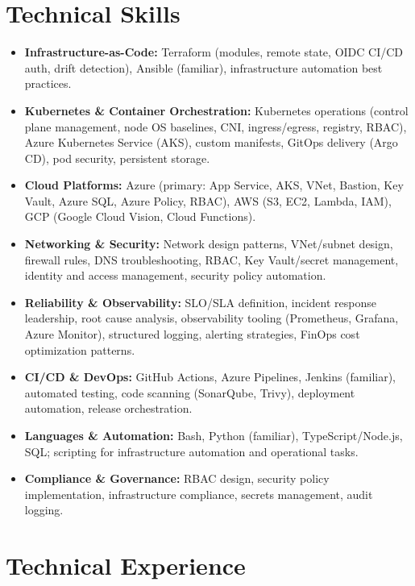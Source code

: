 \documentclass[11pt,a4paper]{article}
\begin{document}
\section{Technical Skills}
\begin{itemize}
    \item \textbf{Infrastructure-as-Code:} Terraform (modules, remote state, OIDC CI/CD auth, drift detection), Ansible (familiar), infrastructure automation best practices.
    \item \textbf{Kubernetes \& Container Orchestration:} Kubernetes operations (control plane management, node OS baselines, CNI, ingress/egress, registry, RBAC), Azure Kubernetes Service (AKS), custom manifests, GitOps delivery (Argo CD), pod security, persistent storage.
    \item \textbf{Cloud Platforms:} Azure (primary: App Service, AKS, VNet, Bastion, Key Vault, Azure SQL, Azure Policy, RBAC), AWS (S3, EC2, Lambda, IAM), GCP (Google Cloud Vision, Cloud Functions).
    \item \textbf{Networking \& Security:} Network design patterns, VNet/subnet design, firewall rules, DNS troubleshooting, RBAC, Key Vault/secret management, identity and access management, security policy automation.
    \item \textbf{Reliability \& Observability:} SLO/SLA definition, incident response leadership, root cause analysis, observability tooling (Prometheus, Grafana, Azure Monitor), structured logging, alerting strategies, FinOps cost optimization patterns.
    \item \textbf{CI/CD \& DevOps:} GitHub Actions, Azure Pipelines, Jenkins (familiar), automated testing, code scanning (SonarQube, Trivy), deployment automation, release orchestration.
    \item \textbf{Languages \& Automation:} Bash, Python (familiar), TypeScript/Node.js, SQL; scripting for infrastructure automation and operational tasks.
    \item \textbf{Compliance \& Governance:} RBAC design, security policy implementation, infrastructure compliance, secrets management, audit logging.
\end{itemize}

\section{Technical Experience}
\end{document}
